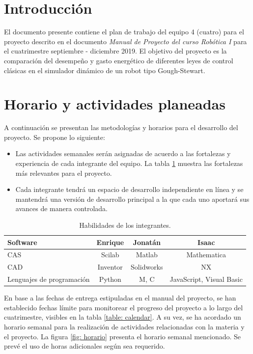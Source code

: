 \section{Introducción}

El documento presente contiene el plan de trabajo del 
equipo 4 (cuatro) para el proyecto descrito en el documento 
\emph{Manual de Proyecto del curso Robótica I} para el 
cuatrimestre septiembre - diciembre 2019.  El objetivo del 
proyecto es la comparación del desempeño y gasto energético 
de diferentes leyes de control clásicas en el simulador 
din\'amico de un robot tipo Gough-Stewart. 


\section{Horario y actividades planeadas}

A continuación se presentan las metodologías y horarios 
para el desarrollo del proyecto. Se propone lo siguiente:

\begin{itemize} 

\item Las actividades semanales ser\'an asignadas de 
acuerdo a las fortalezas y experiencia de cada integrante 
del equipo. La tabla \ref{table: habilidades} muestra las 
fortalezas m\'as relevantes para el proyecto. 

\item Cada integrante tendrá un espacio de desarrollo  
independiente en línea y se mantendrá una versión de 
desarrollo principal a la que cada uno aportará sus avances 
de manera controlada.


\end{itemize}
 
% 
\begin{table} 
\centering \begin{tabular}{p{3cm}|c|c|c} 
Software & Enrique & Jonatán & Isaac\\ 
\hline 
CAS  & Scilab & Matlab & Mathematica\\ 
CAD & Inventor & Solidworks  & NX\\ 
Lenguajes de programación & Python & M, C & JavaScript, 
Visual Basic\\ 
\hline
\end{tabular} 
\caption{Habilidades de los integrantes.} 
\label{table: habilidades} 
\end{table}

En base a las fechas de entrega estipuladas en el manual 
del proyecto, se han establecido fechas l\'imite para 
monitorear el progreso del proyecto a lo largo del 
cuatrimestre, visibles en la tabla \ref{table: calendar}. A 
su vez, se ha acordado un horario semanal para la 
realizaci\'on de actividades relacionadas con la materia y 
el proyecto. La figura \ref{fig: horario} presenta el 
horario semanal mencionado. Se prev\'e el uso de horas 
adicionales seg\'un sea requerido.


